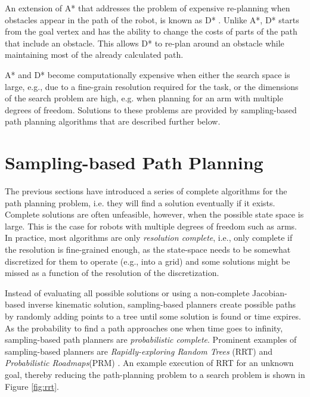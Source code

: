 An extension of A* that addresses the problem of expensive re-planning when obstacles appear in the path of the robot, is known as D* \cite{stentz1994optimal}. Unlike A*, D* starts from the goal vertex and has the ability to change the costs of parts of the path that include an obstacle. This allows D* to re-plan around an obstacle while maintaining most of the already calculated path.

A* and D* become computationally expensive when either the search space is large, e.g., due to a fine-grain resolution required for the task, or the dimensions of the search problem are high, e.g. when planning for an arm with multiple degrees of freedom. Solutions to these problems are provided by sampling-based path planning algorithms that are described further below.




\section{Sampling-based Path Planning}
The previous sections have introduced a series of complete algorithms for the path planning problem, i.e. they will find a solution eventually if it exists. Complete solutions are often unfeasible, however, when the possible state space is large. This is the case for robots with multiple degrees of freedom such as arms. In practice, most algorithms are only \emph{resolution complete}, i.e., only complete if the resolution is fine-grained enough, as the state-space needs to be somewhat discretized for them to operate (e.g., into a grid) and some solutions might be missed as a function of the resolution of the discretization.

Instead of evaluating all possible solutions or using a non-complete Jacobian-based inverse kinematic solution, sampling-based planners create possible paths by randomly adding points to a tree until some solution is found or time expires. As the probability to find a path approaches one when time goes to infinity, sampling-based path planners are \emph{probabilistic complete}. Prominent examples of sampling-based planners are \emph{Rapidly-exploring Random Trees} (RRT)\cite{lavalle1998rapidly} and \emph{Probabilistic Roadmaps}(PRM) \cite{kavraki1996probabilistic}. An example execution of RRT for an unknown goal, thereby reducing the path-planning problem to a search problem is shown in Figure \ref{fig:rrt}.

